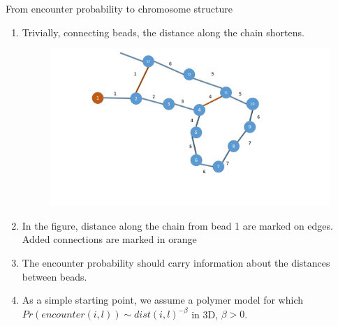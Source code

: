\documentclass[8pt]{beamer}
\begin{document}
\begin{frame}{From encounter probability to chromosome structure}
\begin{enumerate}
\item Trivially, connecting beads, the distance along the chain shortens.
\begin{figure}[H]
\includegraphics[scale=0.15]{connectedBeadsAndDistanceAlongTheChain}
\end{figure}
\item In the figure, distance along the chain from bead 1 are marked on edges. Added connections are marked in orange
\item The encounter probability should carry information about the distances between beads. 
\item As a simple starting point, we assume a polymer model for which $Pr(encounter(i,l))\sim dist(i,l)^{-\beta}$ in 3D, $\beta>0$. 
\end{enumerate}
\end{frame}
\end{document}
